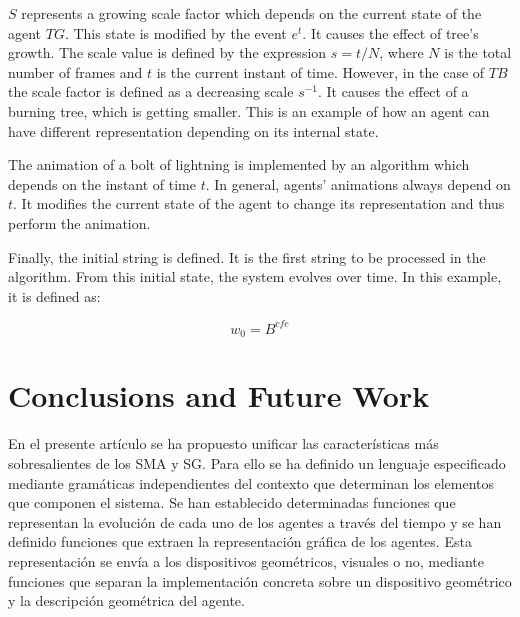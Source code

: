\documentclass[runningheads]{llncs}
\begin{document}
$S$ represents a growing scale factor which depends on the current state of the agent $TG$. This state is modified by the event $e^{t}$. It causes the effect of tree's growth. The scale value is defined by the expression $s = t / N$, where $N$ is the total number of frames and $t$ is the current instant of time. However, in the case of $TB$ the scale factor is defined as a decreasing scale $s^{-1}$. It causes the effect of a burning tree, which is getting smaller. 	
This is an example of how an agent can have different representation depending on its internal state.

The animation of a bolt of lightning is implemented by an algorithm which depends on the instant of time $t$. In general, agents' animations always depend on $t$. It modifies the current state of the agent to change its representation and thus perform the animation.

Finally, the initial string is defined. It is the first string to be processed in the algorithm. From this initial state, the system evolves over time. In this example, it is defined as:

\[w_{0}=B^{cfe}\]	
	
	
	


\section{Conclusions and Future Work
\label{sec:conclusions}}

En el presente artículo se ha propuesto unificar las características más sobresalientes de los SMA y SG. Para ello se ha definido un lenguaje especificado mediante gramáticas independientes del contexto que determinan los elementos que componen el sistema. Se han establecido determinadas funciones que representan la evolución de cada uno de los agentes a través del tiempo y se han definido funciones que extraen la representación gráfica de los agentes. Esta representación se envía a los dispositivos geométricos, visuales o no, mediante funciones que separan la implementación concreta sobre un dispositivo geométrico y la descripción geométrica del agente.
\end{document}
